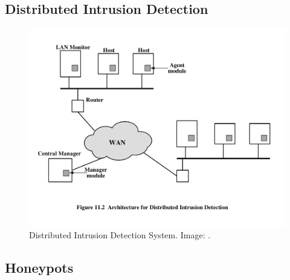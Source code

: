 \documentclass{beamer}
\begin{document}
\subsection{Distributed Intrusion Detection}

\begin{frame}{\insertsubsectionhead}
  \begin{figure}
    \includegraphics[height=0.7\textheight]{dids.pdf}
    \caption{Distributed Intrusion Detection System.
      Image: \cite{Stallings2013nse}.}
  \end{figure}
\end{frame}

\subsection{Honeypots}
\end{document}
